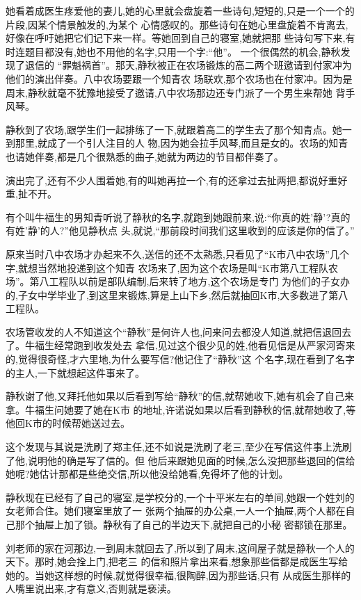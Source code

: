 ﻿\documentclass[12pt]{article}
\begin{document}
她看着成医生疼爱他的妻儿,她的心里就会盘旋着一些诗句,短短的,只是一个一个的片段,因某个情景触发的,为某个
心情感叹的。那些诗句在她心里盘旋着不肯离去,好像在呼吁她把它们记下来一样。等她回到自己的寝室,她就把那
些诗句写下来,有时连题目都没有,她也不用他的名字,只用一个字:``他''。 一个很偶然的机会,静秋发现了退信的
``罪魁祸首''。那天,静秋被正在农场锻炼的高二两个班邀请到付家冲为他们的演出伴奏。八中农场要跟一个知青农
场联欢,那个农场也在付家冲。因为是周末,静秋就毫不犹豫地接受了邀请,八中农场那边还专门派了一个男生来帮她
背手风琴。

静秋到了农场,跟学生们一起排练了一下,就跟着高二的学生去了那个知青点。她一到那里,就成了一个引人注目的人
物,因为她会拉手风琴,而且是女的。农场的知青也请她伴奏,都是几个很熟悉的曲子,她就为两边的节目都伴奏了。

演出完了,还有不少人围着她,有的叫她再拉一个,有的还拿过去扯两把,都说好重好重,扯不开。

有个叫牛福生的男知青听说了静秋的名字,就跑到她跟前来,说:``你真的姓'静'?真的有姓'静'的人?''他见静秋点
头,就说,``那前段时间我们这里收到的应该是你的信了。''

原来当时八中农场才办起来不久,送信的还不太熟悉,只看见了``K市八中农场''几个字,就想当然地投递到这个知青
农场来了,因为这个农场是叫``K市第八工程队农场''。第八工程队以前是部队编制,后来转了地方,这个农场是专门
为他们的子女办的,子女中学毕业了,到这里来锻炼,算是上山下乡,然后就抽回K市,大多数进了第八工程队。

农场管收发的人不知道这个``静秋''是何许人也,问来问去都没人知道,就把信退回去了。牛福生经常跑到收发处去
拿信,见过这个很少见的姓,他看见信是从严家河寄来的,觉得很奇怪,才六里地,为什么要写信?他记住了``静秋''这
个名字,现在看到了名字的主人,一下就想起这件事来了。

静秋谢了他,又拜托他如果以后看到写给``静秋''的信,就帮她收下,她有机会了自己来拿。牛福生问她要了她在K市
的地址,许诺说如果以后看到静秋的信,就帮她收了,等他回K市的时候帮她送过去。

这个发现与其说是洗刷了郑主任,还不如说是洗刷了老三,至少在写信这件事上洗刷了他,说明他的确是写了信的。但
他后来跟她见面的时候,怎么没把那些退回的信给她呢?她估计那都是些绝交信,所以他没给她看,免得坏了他的计划。

静秋现在已经有了自己的寝室,是学校分的,一个十平米左右的单间,她跟一个姓刘的女老师合住。她们寝室里放了一
张两个抽屉的办公桌,一人一个抽屉,两个人都在自己那个抽屉上加了锁。静秋有了自己的半边天下,就把自己的小秘
密都锁在那里。

刘老师的家在河那边,一到周末就回去了,所以到了周末,这间屋子就是静秋一个人的天下。那时,她会拴上门,把老三
的信和照片拿出来看,想象那些信都是成医生写给她的。当她这样想的时候,就觉得很幸福,很陶醉,因为那些话,只有
从成医生那样的人嘴里说出来,才有意义,否则就是亵渎。
\end{document}
